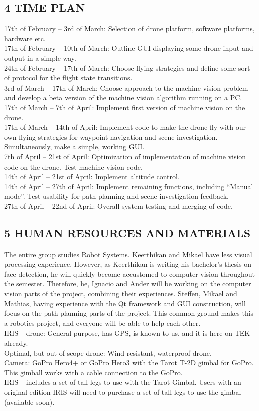 \subsection*{4 TIME PLAN}
17th of February – 3rd of March: Selection of drone platform, software platforms, hardware etc.\\
17th of February – 10th of March: Outline GUI displaying some drone input and output in a simple way.\\
24th of February – 17th of March: Choose flying strategies and define some sort of protocol for the flight state transitions.\\
3rd of March – 17th of March: Choose approach to the machine vision problem and develop a beta version of the machine vision algorithm running on a PC.\\
17th of March – 7th of April: Implement first version of machine vision on the drone.\\
17th of March – 14th of April: Implement code to make the drone fly with our own flying strategies for waypoint navigation and scene investigation. Simultaneously, make a simple, working GUI.\\
7th of April – 21st of April: Optimization of implementation of machine vision code on the drone. Test machine vision code.\\
14th of April – 21st of April: Implement altitude control.\\
14th of April – 27th of April: Implement remaining functions, including “Manual mode”. Test usability for path planning and scene investigation feedback.\\
27th of April – 22nd of April: Overall system testing and merging of code.\\
\subsection*{5 HUMAN RESOURCES AND MATERIALS}
The entire group studies Robot Systems. Keerthikan and Mikael have less visual processing experience. 
However, as Keerthikan is writing his bachelor’s thesis on face detection, he will quickly become accustomed to computer vision throughout the semester. 
Therefore, he, Ignacio and Ander will be working on the computer vision
 parts of the project, combining their experiences.
Steffen, Mikael and Mathias, having experience with the Qt framework 
and GUI construction, will focus on the path planning parts of the project.
This common ground makes this a robotics project, 
and everyone will be able to help each other.\\
IRIS+ drone: General purpose, has GPS, is known to us,
 and it is here on TEK already.\\
Optimal, but out of scope drone: Wind-resistant, waterproof drone.\\
Camera: GoPro Hero4+ or GoPro Hero3 with the Tarot T-2D gimbal
 for GoPro. This gimball works with a cable connection to the GoPro.\\ 
IRIS+ includes a set of tall legs to use with the Tarot Gimbal. 
Users with an original-edition IRIS will need to purchase a set of tall legs to use the gimbal (available soon).
